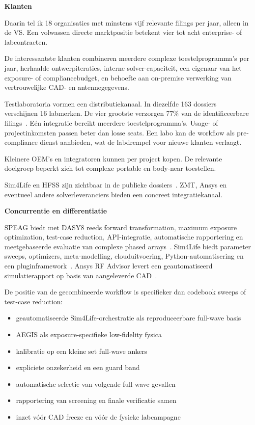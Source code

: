 \documentclass[10pt,a4paper]{article}
\begin{document}
\textbf{Klanten}

Daarin tel ik 18 organisaties met minstens vijf relevante filings per jaar, alleen in de VS. Een volwassen directe marktpositie betekent vier tot acht enterprise- of labcontracten.

De interessantste klanten combineren meerdere complexe toestelprogramma's per jaar, herhaalde ontwerpiteraties, interne solver-capaciteit, een eigenaar van het exposure- of compliancebudget, en behoefte aan on-premise verwerking van vertrouwelijke CAD- en antennegegevens.

Testlaboratoria vormen een distributiekanaal. In diezelfde 163 dossiers verschijnen 16 labmerken. De vier grootste verzorgen 77\% van de identificeerbare filings~\cite{fcc_eas}. Eén integratie bereikt meerdere toestelprogramma's. Usage- of projectinkomsten passen beter dan losse seats. Een labo kan de workflow als pre-compliance dienst aanbieden, wat de labdrempel voor nieuwe klanten verlaagt.

Kleinere OEM's en integratoren kunnen per project kopen. De relevante doelgroep beperkt zich tot complexe portable en body-near toestellen.

Sim4Life en HFSS zijn zichtbaar in de publieke dossiers~\cite{sim4life_v9,ansys_rf}. ZMT, Ansys en eventueel andere solverleveranciers bieden een concreet integratiekanaal.

\textbf{Concurrentie en differentiatie}

SPEAG biedt met DASY8 reeds forward transformation, maximum exposure optimization, test-case reduction, API-integratie, automatische rapportering en meetgebaseerde evaluatie van complexe phased arrays~\cite{speag_dasy8}. Sim4Life biedt parameter sweeps, optimizers, meta-modelling, clouduitvoering, Python-automatisering en een pluginframework~\cite{sim4life_v9}. Ansys RF Advisor levert een geautomatiseerd simulatierapport op basis van aangeleverde CAD~\cite{ansys_rf}.

De positie van de gecombineerde workflow is specifieker dan codebook sweeps of test-case reduction:

\begin{itemize}
  \item geautomatiseerde Sim4Life-orchestratie als reproduceerbare full-wave basis
  \item AEGIS als exposure-specifieke low-fidelity fysica
  \item kalibratie op een kleine set full-wave ankers
  \item expliciete onzekerheid en een guard band
  \item automatische selectie van volgende full-wave gevallen
  \item rapportering van screening en finale verificatie samen
  \item inzet vóór CAD freeze en vóór de fysieke labcampagne
\end{itemize}
\end{document}

